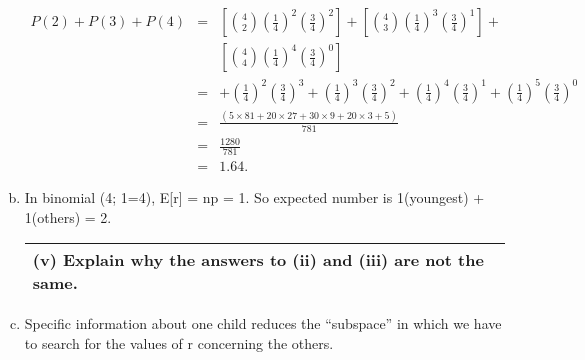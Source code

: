 \documentclass[a4paper,12pt]{article}
\begin{document}
\begin{enumerate}[(a)]
\begin{eqnarray*} 
P(2)+P(3)+P(4) &=& 
\left[ { 4 \choose 2}
\left( \frac{1}{4} \right) ^2 \left(\frac{3}{4}\right)^2 \right]+ 
\left[ { 4 \choose 3}
\left( \frac{1}{4} \right) ^3  \left(\frac{3}{4}\right)^1 \right]
+\\ & & \left[ { 4 \choose 4}
\left( \frac{1}{4} \right) ^4  \left(\frac{3}{4}\right)^{0} \right]
\\  &=& 
+ \left( \frac{1}{4} \right) ^2  \left(\frac{3}{4}\right)^{3}
+ \left( \frac{1}{4} \right) ^3  \left(\frac{3}{4}\right)^{2}
+ \left( \frac{1}{4} \right) ^4  \left(\frac{3}{4}\right)^{1}
+ \left( \frac{1}{4} \right) ^5  \left(\frac{3}{4}\right)^{0} 
\\ &=&  \frac{(5\times 81+20\times 27+30\times 9+20\times 3+5)}{781}    \\
 &=& \frac{1280}{781} \\
 &=& 1.64.
\end{eqnarray*}

\item In binomial (4; 1=4), E[r] = np = 1.
So expected number is 1(youngest) + 1(others) = 2.
\newpage
  \begin{table}[ht!]
     \centering
     \begin{tabular}{|p{15cm}|}
     \hline     
(v) Explain why the answers to (ii) and (iii) are not the same.\\ \hline
      \end{tabular}
    \end{table}
\item Specific information about one child reduces the “subspace” in which we
have to search for the values of r concerning the others.
\end{enumerate}
\end{document}
